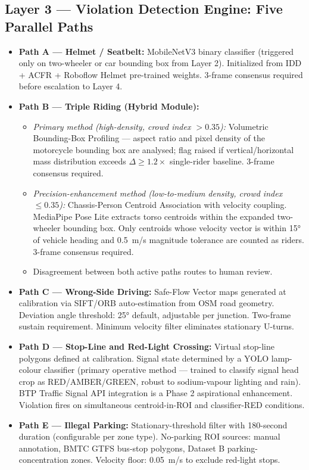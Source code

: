 \documentclass[11pt,a4paper]{article}
\begin{document}
\subsection*{Layer 3 — Violation Detection Engine: Five Parallel Paths}

\begin{itemize}[leftmargin=1.8em, itemsep=0.4em]
    \item \textbf{Path A — Helmet / Seatbelt:} MobileNetV3 binary classifier (triggered only on two-wheeler or car bounding box from Layer 2). Initialized from IDD + ACFR + Roboflow Helmet pre-trained weights. 3-frame consensus required before escalation to Layer 4.

    \item \textbf{Path B — Triple Riding (Hybrid Module):}
    \begin{itemize}[leftmargin=1.5em, itemsep=0.2em]
        \item \textit{Primary method (high-density, crowd index $> 0.35$):} Volumetric Bounding-Box Profiling — aspect ratio and pixel density of the motorcycle bounding box are analysed; flag raised if vertical/horizontal mass distribution exceeds $\Delta \geq 1.2\times$ single-rider baseline. 3-frame consensus required.
        \item \textit{Precision-enhancement method (low-to-medium density, crowd index $\leq 0.35$):} Chassis-Person Centroid Association with velocity coupling. MediaPipe Pose Lite extracts torso centroids within the expanded two-wheeler bounding box. Only centroids whose velocity vector is within 15° of vehicle heading and 0.5~m/s magnitude tolerance are counted as riders. 3-frame consensus required.
        \item Disagreement between both active paths routes to human review.
    \end{itemize}

    \item \textbf{Path C — Wrong-Side Driving:} Safe-Flow Vector maps generated at calibration via SIFT/ORB auto-estimation from OSM road geometry. Deviation angle threshold: 25° default, adjustable per junction. Two-frame sustain requirement. Minimum velocity filter eliminates stationary U-turns.

    \item \textbf{Path D — Stop-Line and Red-Light Crossing:} Virtual stop-line polygons defined at calibration. Signal state determined by a YOLO lamp-colour classifier (primary operative method — trained to classify signal head crop as RED/AMBER/GREEN, robust to sodium-vapour lighting and rain). BTP Traffic Signal API integration is a Phase 2 aspirational enhancement. Violation fires on simultaneous centroid-in-ROI and classifier-RED conditions.

    \item \textbf{Path E — Illegal Parking:} Stationary-threshold filter with 180-second duration (configurable per zone type). No-parking ROI sources: manual annotation, BMTC GTFS bus-stop polygons, Dataset B parking-concentration zones. Velocity floor: 0.05~m/s to exclude red-light stops.
\end{itemize}
\end{document}
